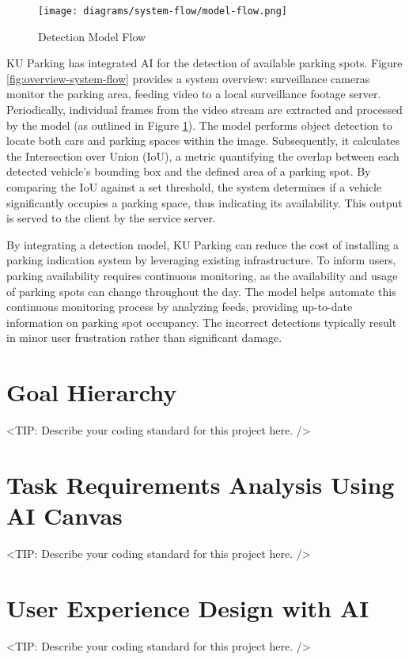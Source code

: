 \begin{figure}[H]
    \centering
    \texttt{[image: diagrams/system-flow/model-flow.png]}
    \caption{Detection Model Flow}
    \label{fig:model-flow}
\end{figure}


KU Parking has integrated AI for the detection of available parking spots. Figure \ref{fig:overview-system-flow} provides a system overview: surveillance cameras monitor the parking area, feeding video to a local surveillance footage server. Periodically, individual frames from the video stream are extracted and processed by the model (as outlined in Figure \ref{fig:model-flow}). The model performs object detection to locate both cars and parking spaces within the image. Subsequently, it calculates the Intersection over Union (IoU), a metric quantifying the overlap between each detected vehicle's bounding box and the defined area of a parking spot. By comparing the IoU against a set threshold, the system determines if a vehicle significantly occupies a parking space, thus indicating its availability. This output is served to the client by the service server.

By integrating a detection model, KU Parking can reduce the cost of installing a parking indication system by leveraging existing infrastructure. To inform users, parking availability requires continuous monitoring, as the availability and usage of parking spots can change throughout the day. The model helps automate this continuous monitoring process by analyzing feeds, providing up-to-date information on parking spot occupancy. The incorrect detections typically result in minor user frustration rather than significant damage.

\section{Goal Hierarchy}
\label{section:goal-hierarchy}
<TIP: Describe your coding standard for this project here. />

\section{Task Requirements Analysis Using AI Canvas}
\label{section:task-requirement-analysis-using-ai-canvas}
<TIP: Describe your coding standard for this project here. />


\section{User Experience Design with AI}
\label{section:user-experience-with-ai}
<TIP: Describe your coding standard for this project here. />
